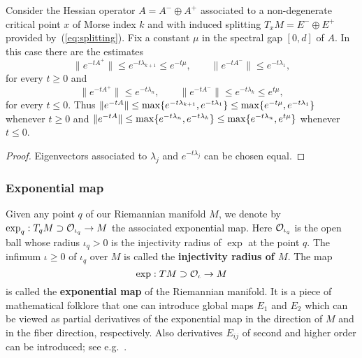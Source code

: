 \documentclass{article}
\begin{document}
\begin{proposition}\label{prop:exp-est}
Consider the Hessian operator $A=A^-\oplus A^+$
associated to a non-degenerate critical point
$x$ of Morse index $k$ and with induced splitting
$T_xM=E^-\oplus E^+$ provided by~(\ref{eq:splitting}). Fix a constant $\mu$
in the spectral gap $[0,d]$ of $A$. In this case
there are the estimates
$$
     \bigl\| e^{-tA^+}\bigr\|
     \le e^{-t\lambda_{k+1}}
     \le e^{-t\mu}
     ,\qquad
     \bigl\| e^{-tA^-}\bigr\|
     \le e^{-t\lambda_1},
$$
for every $t\ge 0$ and
$$
     \bigl\| e^{-tA^+}\bigr\|
     \le e^{-t\lambda_n}
     ,\qquad
     \bigl\| e^{-tA^-}\bigr\|
     \le e^{-t\lambda_k}
     \le e^{t\mu},
$$
for every $t\le 0$.
Thus
$
     \mathopen\|e^{-tA}\mathclose\|
     \le\max\{e^{-t\lambda_{k+1}}, e^{-t\lambda_1}\}
     \le\max\{e^{-t\mu}, e^{-t\lambda_1}\}
$
whenever $t\ge 0$ and
$
     \mathopen\|e^{-tA}\mathclose\|
     \le\max\{e^{-t\lambda_n}, e^{-t\lambda_k}\}
     \le\max\{e^{-t\lambda_n}, e^{t\mu}\}
$
whenever $t\le 0$.
\end{proposition}

\begin{proof}
Eigenvectors associated to $\lambda_j$ and $e^{-t\lambda_j}$ can be chosen equal.
\end{proof}


\subsubsection*{Exponential map}%
Given any point $q$ of our Riemannian manifold $M$, we denote by $\exp_q:T_qM\supset {\mathcal{O}}_{\iota_q}\to M$
the associated exponential map. Here ${\mathcal{O}}_{\iota_q}$ is the open ball whose radius $\iota_q>0$ is the injectivity
radius of $\exp$ at the point $q$. The infimum $\iota\ge 0$ of $\iota_q$ over $M$ is called the
{\bf injectivity radius of \boldmath$M$}. The map
$$
     \exp:TM\supset{\mathcal{O}}_\iota\to M
$$
is called the {\bf exponential map} of the Riemannian manifold.
%
It is a piece of mathematical folklore that one can introduce
global maps $E_1$ and $E_2$ which can be viewed as partial derivatives
of the exponential map in the direction of $M$ and in the fiber direction, respectively.
Also derivatives $E_{ij}$ of second and higher order can be introduced; see e.g.~\cite[\S2.1]{weber:2014a}.
\end{document}
